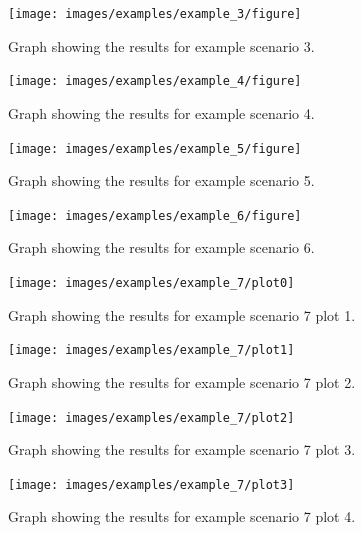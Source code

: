 \documentclass{l4proj}
\begin{document}
\clearpage
\begin{figure}[htbp]
    \centering
    \texttt{[image: images/examples/example\_3/figure]}
    ~
    \caption{Graph showing the results for example scenario 3.}
    \label{fig:example3}
\end{figure}

\clearpage
\begin{figure}[htbp]
    \centering
    \texttt{[image: images/examples/example\_4/figure]}
    ~
    \caption{Graph showing the results for example scenario 4.}
    \label{fig:example4}
\end{figure}

\clearpage
\begin{figure}[htbp]
    \centering
    \texttt{[image: images/examples/example\_5/figure]}
    ~
    \caption{Graph showing the results for example scenario 5.}
    \label{fig:example5}
\end{figure}

\clearpage
\begin{figure}
    \centering
    \texttt{[image: images/examples/example\_6/figure]}
    ~
    \caption{Graph showing the results for example scenario 6.}
    \label{fig:example6}
\end{figure}

\clearpage
\begin{figure}[htbp]
    \centering
    \texttt{[image: images/examples/example\_7/plot0]}
    ~
    \caption{Graph showing the results for example scenario 7 plot 1.}
    \label{fig:example7_plot1}
\end{figure}

\clearpage

\begin{figure}[htbp]
    \centering
    \texttt{[image: images/examples/example\_7/plot1]}
    ~
    \caption{Graph showing the results for example scenario 7 plot 2.}
    \label{fig:example7_plo2}
\end{figure}

\clearpage
\begin{figure}[htbp]
    \centering
    \texttt{[image: images/examples/example\_7/plot2]}
    ~
    \caption{Graph showing the results for example scenario 7 plot 3.}
    \label{fig:example7_plot3}
\end{figure}

\clearpage
\begin{figure}[htbp]
    \centering
    \texttt{[image: images/examples/example\_7/plot3]}
    ~
    \caption{Graph showing the results for example scenario 7 plot 4.}
    \label{fig:example7_plot4}
\end{figure}






\end{document}
